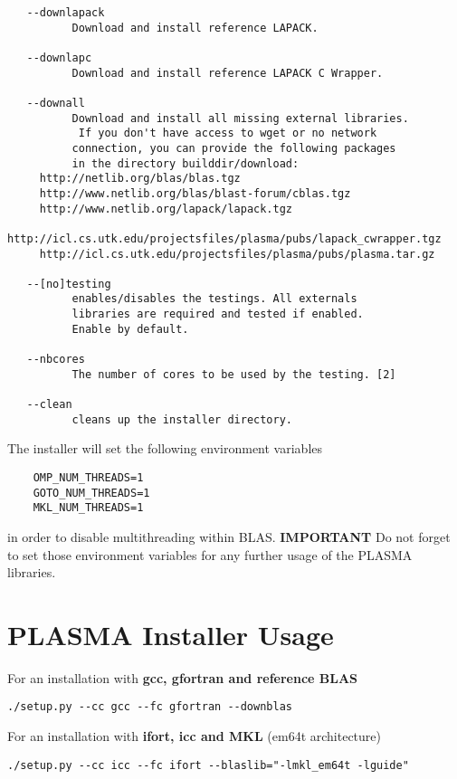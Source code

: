 \begin{verbatim}
   --downlapack 
          Download and install reference LAPACK.

   --downlapc 
          Download and install reference LAPACK C Wrapper.

   --downall 
          Download and install all missing external libraries.
           If you don't have access to wget or no network
          connection, you can provide the following packages
          in the directory builddir/download:
     http://netlib.org/blas/blas.tgz
     http://www.netlib.org/blas/blast-forum/cblas.tgz
     http://www.netlib.org/lapack/lapack.tgz
     http://icl.cs.utk.edu/projectsfiles/plasma/pubs/lapack_cwrapper.tgz
     http://icl.cs.utk.edu/projectsfiles/plasma/pubs/plasma.tar.gz

   --[no]testing 
          enables/disables the testings. All externals
          libraries are required and tested if enabled.
          Enable by default.

   --nbcores 
          The number of cores to be used by the testing. [2]

   --clean 
          cleans up the installer directory.
\end{verbatim}

The installer will set the following environment variables 
\begin{verbatim}
	OMP_NUM_THREADS=1
	GOTO_NUM_THREADS=1
	MKL_NUM_THREADS=1
\end{verbatim}
in order to disable multithreading within BLAS. \textbf{IMPORTANT} Do
not forget to set those environment variables for any further usage of
the PLASMA libraries.  

\section{PLASMA Installer Usage}

For an installation with {\bf gcc, gfortran and reference BLAS}
\begin{verbatim}
./setup.py --cc gcc --fc gfortran --downblas
\end{verbatim}

For an installation with {\bf ifort, icc and MKL} (em64t architecture)
\begin{verbatim}
./setup.py --cc icc --fc ifort --blaslib="-lmkl_em64t -lguide"
\end{verbatim}



